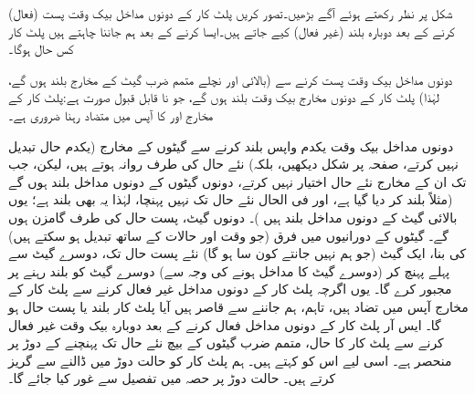 شکل  پر نظر رکھتے ہوئے آگے بڑھیں۔تصور کریں پلٹ کار کے دونوں مداخل بیک وقت پست (فعال) کرنے کے بعد دوبارہ بلند (غیر فعال) کیے جاتے ہیں۔ایسا کرنے کے بعد ہم جاننا چاہتے ہیں پلٹ کار کس حال ہوگا۔

دونوں مداخل بیک وقت پست کرنے سے (بالائی اور نچلے متمم ضرب گیٹ کے مخارج بلند ہوں گے، لہٰذا) پلٹ کار کے دونوں مخارج بیک وقت بلند ہوں گے، جو نا قابل قبول صورت ہے:پلٹ کار کے مخارج  اور  کا آپس میں متضاد رہنا ضروری ہے۔

 دونوں مداخل بیک وقت یکدم واپس بلند کرنے سے گیٹوں کے مخارج (یکدم حال تبدیل نہیں کرتے، صفحہ  پر شکل  دیکھیں، بلکہ) نئے حال کی طرف روانہ ہوتے ہیں، لیکن، جب تک ان کے مخارج نئے حال اختیار نہیں کرتے، دونوں گیٹوں کے دونوں مداخل بلند ہوں گے (مثلاً  بلند کر دیا گیا ہے، اور فی الحال  نئے حال تک نہیں پہنچا، لہٰذا یہ بھی بلند ہے؛ یوں بالائی گیٹ کے دونوں مداخل بلند ہیں )۔ دونوں گیٹ، پست حال کی طرف گامزن ہوں گے۔ گیٹوں کے دورانیوں میں فرق (جو وقت اور حالات کے ساتھ تبدیل ہو سکتے ہیں) کی بنا، ایک گیٹ (جو ہم نہیں جانتے کون سا ہو گا) نئے پست حال تک، دوسرے گیٹ سے پہلے پہنچ کر (دوسرے گیٹ کا مداخل ہونے کی وجہ سے) دوسرے گیٹ کو بلند رہنے پر مجبور کرے گا۔ یوں اگرچہ پلٹ کار کے دونوں مداخل غیر فعال کرنے سے پلٹ کار کے مخارج آپس میں تضاد ہیں، تاہم، ہم جاننے سے قاصر ہیں آیا پلٹ کار بلند یا پست حال ہو گا۔ ایس آر پلٹ کار کے دونوں مداخل فعال کرنے کے بعد دوبارہ بیک وقت غیر فعال کرنے سے پلٹ کار کا حال، متمم ضرب گیٹوں کے بیچ نئے حال تک پہنچنے کے دوڑ پر منحصر ہے۔ اسی لیے اس کو  کہتے ہیں۔ ہم پلٹ کار کو حالت دوڑ میں ڈالنے سے گریز کرتے ہیں۔ حالت دوڑ پر حصہ  میں تفصیل سے غور کیا جائے گا۔
 

